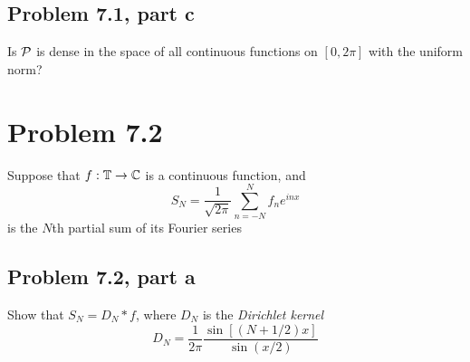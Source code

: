 \newpage
\subsection{Problem 7.1, part c}
Is $\mathcal{P}$ is dense in the space of all continuous functions on $[0, 2\pi]$ with the uniform norm?

\newpage
\section{Problem 7.2}
Suppose that $f: \mathbb{T} \rightarrow \mathbb{C}$ is a continuous function, and 
\[S_N = \frac{1}{\sqrt{2\pi}} \sum_{n = -N}^{N} \hat{f}_n e^{inx} \]
is the $N$th partial sum of its Fourier series

\subsection{Problem 7.2, part a}
Show that $S_N = D_N \ast f$, where $D_N$ is the \textit{Dirichlet kernel}
\[D_N = \frac{1}{2\pi}\frac{\sin [(N + 1/2)x]}{\sin(x/2)}\]
\partbreak
